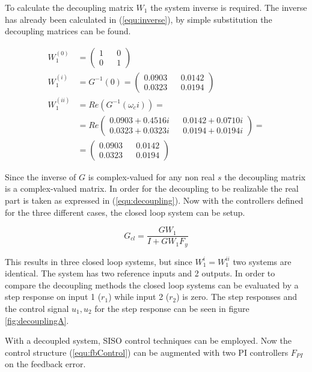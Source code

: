 \documentclass[a4paper, titlepage]{article}
\begin{document}
To calculate the decoupling matrix $W_1$ the system inverse is required.
The inverse has already been calculated in (\ref{equ:inverse}), by simple substitution the decoupling matrices can be found.

\begin{equation}
\begin{split}
W^{(0)}_1 &= 
\begin{pmatrix}
1 && 0 \\ 0 && 1
\end{pmatrix} \\
W^{(i)}_1 &= G^{-1}(0) = 
\begin{pmatrix}
0.0903 && 0.0142 \\ 0.0323 && 0.0194
\end{pmatrix} \\
W^{(ii)}_1 &= Re(G^{-1}(\omega_ci)) = \\
&=
Re\begin{pmatrix}
0.0903 + 0.4516i && 0.0142 + 0.0710i \\
0.0323 + 0.0323i && 0.0194 + 0.0194i
\end{pmatrix} = \\
&= 
\begin{pmatrix}
0.0903 && 0.0142 \\ 0.0323 && 0.0194
\end{pmatrix}
\end{split}
\label{equ:decoupling}
\end{equation}

Since the inverse of $G$ is complex-valued for any non real $s$ the decoupling matrix is a complex-valued matrix.
In order for the decoupling to be realizable the real part is taken as expressed in (\ref{equ:decoupling}).
Now with the controllers defined for the three different cases, the closed loop system can be setup.

\begin{equation}
G_{cl} = \frac{GW_1}{I+GW_1F_y}
\label{equ:closedLoopDecoup}
\end{equation}

This results in three closed loop systems, but since $W^{i}_1 = W^{ii}_1$ two systems are identical.
The system has two reference inputs and 2 outputs.
In order to compare the decoupling methods the closed loop systems can be evaluated by a step response on input 1 ($r_1$) while input 2 ($r_2$) is zero.
The step responses and the control signal $u_1, u_2$ for the step response can be seen in figure \ref{fig:decouplingA}.

With a decoupled system, SISO control techniques can be employed.
Now the control structure (\ref{equ:fbControl}) can be augmented with two PI controllers $F_{PI}$ on the feedback error.
\end{document}
